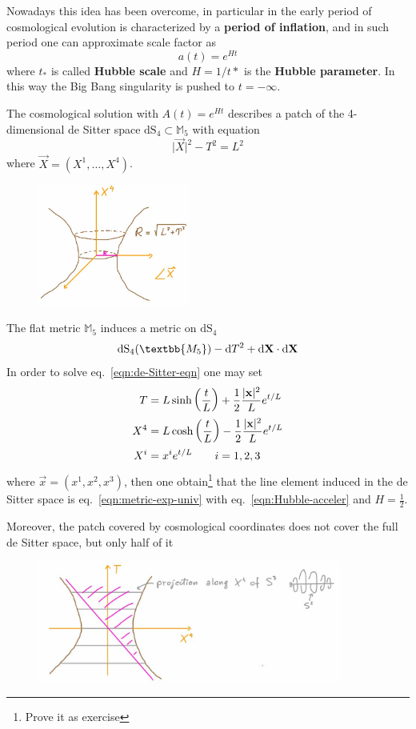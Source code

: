 \documentclass[../main/main.tex]{subfiles}
\begin{document}
\begin{example}
Nowadays this idea has been overcome, in particular in the early period of cosmological evolution is characterized by a \textbf{period of inflation}, and in such period one can approximate scale factor as
\begin{equation}\label{eqn:Hubble-acceler}
\boxed{a(t)=e^{Ht}}
\end{equation}
where $t_*$ is called \textbf{Hubble scale} and $H=1/t*$ is the \textbf{Hubble parameter}. In this way the Big Bang singularity is pushed to $t=-\infty$.

The cosmological solution with $A(t)=e^{Ht}$ describes a patch of the 4-dimensional de Sitter space $\text{dS}_4\subset\mathbb M_5$ with equation
\begin{equation}\label{eqn:de-Sitter-eqn}
\vert\vec X\vert^2-T^2=L^2
\end{equation}
where $\vec X=(X^1,\dots,X^4)$.
\begin{figure}[H]
\centering
\includegraphics[width=5cm]{../img/de-Sitter-expanding-univ.jpg}
\end{figure}
\noindent
The flat metric $\mathbb M_5$ induces a metric on $\text{dS}_4$
\[\text{dS}_4(\textbb{M_5})-\de T^2+\de \vec X\cdot \de\vec X\]
In order to solve eq.~\eqref{eqn:de-Sitter-eqn} one may set
\begin{align*}
T&=L\sinh\left(\frac tL\right)+\frac12\frac{|\mathbf x|^2}Le^{t/L}\\
X^4&=L\cosh\left(\frac tL\right)-\frac12\frac{|\mathbf x|^2}Le^{t/L}\\
X^i&=x^ie^{t/L}\qquad i=1,2,3
\end{align*}
where $\vec x=(x^1,x^2,x^3)$, then one obtain\footnote{Prove it as exercise} that the line element induced in the de Sitter space is eq.~\eqref{eqn:metric-exp-univ} with eq.~\eqref{eqn:Hubble-acceler} and $H=\frac12$. 

Moreover, the patch covered by cosmological coordinates does not cover the full de Sitter space, but only half of it
\begin{figure}[H]
\centering
\includegraphics[width=10cm]{../img/patch-de-Sitter-expand-univ.jpg}
\end{figure}


\end{example}
\end{document}
